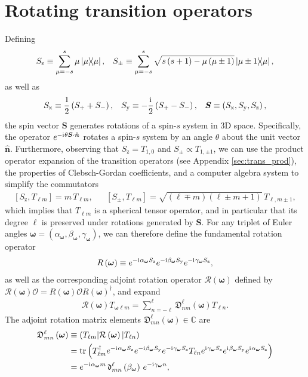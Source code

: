 \documentclass[notitlepage,twocolumn]{revtex4-2}
\newcommand{\f}[2]{\dfrac{#1}{#2}} %
\newcommand{\p}[1]{\left(#1\right)} %
\renewcommand{\sp}[1]{\left[#1\right]} %
\renewcommand{\v}{\bm} %
\newcommand{\uv}[1]{\bm{\hat{#1}}} %
\renewcommand{\i}{\mathrm{i}\mkern1mu} %
\newcommand{\1}{\mathds{1}}
\newcommand{\x}{\text{x}}
\newcommand{\y}{\text{y}}
\newcommand{\z}{\text{z}}
\renewcommand{\O}{\mathcal{O}}
\newcommand{\R}{\mathcal{R}}
\newcommand{\D}{\mathfrak{D}}
\renewcommand{\dd}{\mathfrak{d}}
\newcommand{\CC}{\mathbb{C}}
\def\obk#1{\mathinner{({#1})}}
\begin{document}
\onecolumngrid
\appendix

\section{Rotating transition operators}
\label{sec:rotations}

Defining
\begin{align}
  S_\z \equiv \sum_{\mu=-s}^s \mu \op{\mu},
  &&
  S_\pm \equiv \sum_{\mu=-s}^s
  \sqrt{s\p{s+1}-\mu\p{\mu\pm1}} \op{\mu\pm1}{\mu},
\end{align}
as well as
\begin{align}
  S_\x \equiv \f12\p{S_+ + S_-},
  &&
  S_\y \equiv -\f\i2\p{S_+-S_-},
  &&
  \v S \equiv \p{S_\x,S_\y,S_\z},
\end{align}
the spin vector $\v S$ generates rotations of a spin-$s$ system in 3D space.
Specifically, the operator $e^{-\i\theta\v S\cdot\uv n}$ rotates a spin-$s$ system by an angle $\theta$ about the unit vector $\uv n$.
Furthermore, observing that $S_\z=T_{1,0}$ and $S_\pm\propto T_{1,\pm1}$, we can use the product operator expansion of the transition operators (see Appendix \ref{sec:trans_prod}), the properties of Clebsch-Gordan coefficients, and a computer algebra system to simplify the commutators
\begin{align}
  \sp{S_\z,T_{\ell m}} = m\, T_{\ell m},
  &&
  \sp{S_\pm,T_{\ell m}} = \sqrt{\p{\ell\mp m}\p{\ell\pm m+1}}\, T_{\ell,m\pm1},
\end{align}
which implies that $T_{\ell m}$ is a spherical tensor operator, and in particular that its degree $\ell$ is preserved under rotations generated by $\v S$.
For any triplet of Euler angles $\v\omega=\p{\alpha_{\v\omega},\beta_{\v\omega},\gamma_{\v\omega}}$, we can therefore define the fundamental rotation operator
\begin{align}
  R\p{\v\omega} \equiv e^{-\i\alpha_{\v\omega}S_\z} e^{-\i\beta_{\v\omega}S_\y} e^{-\i\gamma_{\v\omega}S_\z},
\end{align}
as well as the corresponding adjoint rotation operator $\R\p{\v\omega}$ defined by $\R\p{\v\omega}\O = R\p{\v\omega} \O R\p{\v\omega}^\dag$, and expand
\begin{align}
  \R\p{\v\omega} T_{\v\omega\ell m}
  = \sum_{n=-\ell}^\ell \D_{nm}^\ell\p{\v\omega} T_{\ell n}.
\end{align}
The adjoint rotation matrix elements $\D_{mn}^\ell\p{\v\omega}\in\CC$ are
\begin{align}
  \D_{mn}^\ell\p{\v\omega}
  &\equiv \obk{T_{\ell m}|\R\p{\v\omega}|T_{\ell n}} \\
  &= \tr\p{T_{\ell m}^\dag e^{-\i\alpha_{\v\omega}S_\z} e^{-\i\beta_{\v\omega}S_\y} e^{-\i\gamma_{\v\omega}S_\z} T_{\ell n}
    e^{\i\gamma_{\v\omega}S_\z} e^{\i\beta_{\v\omega}S_\y} e^{\i\alpha_{\v\omega}S_\z}} \\
  &= e^{-\i\alpha_{\v\omega} m} \,\dd_{mn}^\ell\p{\beta_{\v\omega}}\, e^{-\i\gamma_{\v\omega} n},
\end{align}
\end{document}
